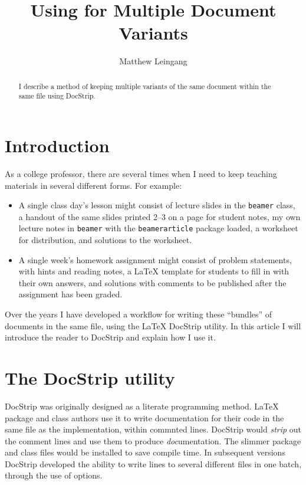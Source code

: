 \documentclass{ltugboat}
\title{Using \docstrip{} for Multiple Document Variants}
\author{Matthew Leingang}
\newcommand{\cls}[1]{\texttt{#1}} %
\newcommand{\pkg}[1]{\texttt{#1}} %
\newcommand{\docstrip}{\texorpdfstring{\textsf{DocStrip}}{DocStrip}}
\begin{document}
\maketitle

\begin{abstract}
    I describe a method of keeping multiple variants of the same document
    within the same file using \docstrip.
\end{abstract}

\section{Introduction}

As a college professor, there are several times when I need to keep teaching
materials in several different forms.  For example:

\begin{itemize}
    \item A single class day's lesson might consist of lecture slides in the
    \cls{beamer} class, a handout of the same slides printed 2–3 on a page for
    student notes, my own lecture notes in \cls{beamer} with the
    \pkg{beamerarticle} package loaded, a worksheet for distribution, and
    solutions to the worksheet.

    \item A single week's homework assignment might consist of problem
    statements, with hints and reading notes, a \LaTeX{} template for students
    to fill in with their own answers, and solutions with comments to be
    published after the assignment has been graded.
\end{itemize}

Over the years I have developed a workflow for writing these ``bundles'' of
documents in the same file, using the \LaTeX{} \docstrip{} utility.  In this
article I will introduce the reader to \docstrip{} and explain how I use it.

\section{The \docstrip{} utility}

\docstrip{} \cite{docstrip} was originally designed as a literate programming method.  \LaTeX{}
package and class authors use it to write documentation for their code in the same
file as the implementation, within commnted lines.  \docstrip{} would
\emph{strip} out the comment lines and use them to produce \emph{doc}umentation.
The slimmer package and class files would be installed to save compile time.  In
subsequent versions \docstrip{} developed the ability to write lines to several
different files in one batch, through the use of options.
\end{document}
